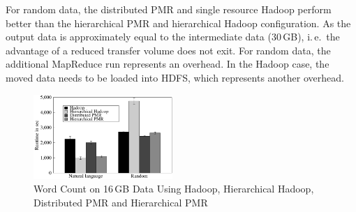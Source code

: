 \documentclass{sig-alternate}
\newcommand{\upp}{\vspace*{-0.5em}}
\begin{document}

For random data, the distributed PMR and single resource Hadoop
perform better than the hierarchical PMR and hierarchical Hadoop
configuration. As the output data is approximately equal to the
intermediate data (30\,GB), i.\,e.\ the advantage of a reduced
transfer volume does not exit. For random data, the additional
MapReduce run represents an overhead. In the Hadoop case, the moved
data needs to be loaded into HDFS, which represents another overhead.




\begin{figure}[t]
	\upp
	\centering
		\includegraphics[width=0.47\textwidth]{figures/allmrs_rands.pdf}
\caption{Word Count on 16\,GB Data Using Hadoop, Hierarchical Hadoop, Distributed PMR  and Hierarchical PMR} 	
\label{fig:allmrs_rands}
\end{figure}		
\end{document}
